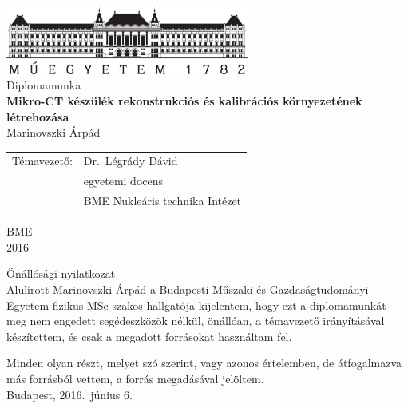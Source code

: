 \documentclass[a4paper,12pt,twoside]{article}
\begin{document}
\frenchspacing



 \begin{center} \includegraphics[width=80mm,keepaspectratio]{abrak/bmelogo.jpg}\\ \vspace{0.3cm}  \Large Diplomamunka \\[1.5cm] \vspace{0.5cm} { \large \textbf{ Mikro-CT készülék rekonstrukciós és kalibrációs környezetének létrehozása}}\\[2.5cm] \vspace{0.2cm} \large Marinovszki Árpád\\[5cm] \begin{tabular}{ll} Témavezető: & Dr.\ Légrády Dávid \\ & egyetemi docens \\ & BME Nukleáris technika Intézet \\ \end{tabular} \vfill \large BME \\ \large 2016 \end{center} 
 
 \clearpage \setcounter{page}{1}
 
   

\clearpage

{\large Önállósági nyilatkozat}
\\[0.5cm]



Alulírott Marinovszki Árpád a Budapesti Műszaki és Gazdaságtudományi Egyetem fizikus MSc szakos hallgatója kijelentem, hogy ezt a diplomamunkát meg nem engedett segédeszközök nélkül, önállóan, a témavezető irányításával készítettem, és csak a megadott forrásokat használtam fel. 


Minden olyan részt, melyet szó szerint, vagy azonos értelemben, de átfogalmazva más forrásból vettem, a forrás megadásával jelöltem.
\\[0.3cm]

Budapest, 2016.\ június 6.

\hspace{9cm}\makebox[1.5in]{\hrulefill}
\end{document}
